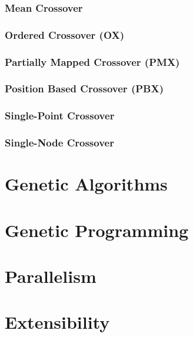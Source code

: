       \subsubsection{Mean Crossover}
      \label{sec:keen:operators:crossover:mean}
        \Blindtext
      \subsubsection{Ordered Crossover (OX)}
      \label{sec:keen:operators:crossover:ordered}
        \Blindtext
      \subsubsection{Partially Mapped Crossover (PMX)}
      \label{sec:keen:operators:crossover:partially_mapped}
        \Blindtext
      \subsubsection{Position Based Crossover (PBX)}
      \label{sec:keen:operators:crossover:position_based}
        \Blindtext
      \subsubsection{Single-Point Crossover}
      \label{sec:keen:operators:crossover:single_point}
        \Blindtext
      \subsubsection{Single-Node Crossover}
      \label{sec:keen:operators:crossover:single_node}
        \Blindtext
  \section{Genetic Algorithms}
  \label{sec:genetic_algorithms}
    \Blindtext
  \section{Genetic Programming}
  \label{sec:genetic_programming}
    \Blindtext
  \section{Parallelism}
  \label{sec:parallelism}
    \Blindtext
  \section{Extensibility}
  \label{sec:extensibility}
    \Blindtext
